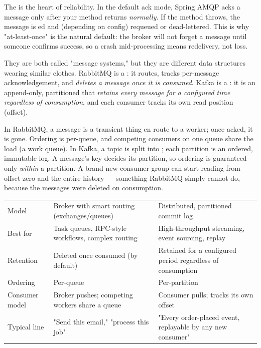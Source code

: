 \begin{behind}
The  is the heart of reliability. In the default  ack mode, Spring AMQP acks a message only after your  method returns \emph{normally}. If the method throws, the message is ed and (depending on config) requeued or dead-lettered. This is why "at-least-once" is the natural default: the broker will not forget a message until someone confirms success, so a crash mid-processing means redelivery, not loss.
\end{behind}


 They are both called "message systems," but they are different data structures wearing similar clothes. RabbitMQ is a : it routes, tracks per-message acknowledgement, and \emph{deletes a message once it is consumed}. Kafka is a : it is an append-only, partitioned  that \emph{retains every message for a configured time regardless of consumption}, and each consumer tracks its own read position (offset).

 In RabbitMQ, a message is a transient thing en route to a worker; once acked, it is gone. Ordering is per-queue, and competing consumers on one queue share the load (a work queue). In Kafka, a topic is split into ; each partition is an ordered, immutable log. A message's key decides its partition, so ordering is guaranteed only \emph{within} a partition. A brand-new consumer group can start reading from offset zero and  the entire history --- something RabbitMQ simply cannot do, because the messages were deleted on consumption.

\begin{center}\small
\begin{tabularx}{\linewidth}{@{}L{24mm} X X@{}}
 &  & \\\midrule
Model & Broker with smart routing (exchanges/queues) & Distributed, partitioned commit log\\
Best for & Task queues, RPC-style workflows, complex routing & High-throughput streaming, event sourcing, replay\\
Retention & Deleted once consumed (by default) & Retained for a configured period regardless of consumption\\
Ordering & Per-queue & Per-partition\\
Consumer model & Broker pushes; competing workers share a queue & Consumer pulls; tracks its own offset\\
Typical line & "Send this email," "process this job" & "Every order-placed event, replayable by any new consumer"\\
\end{tabularx}\end{center}

